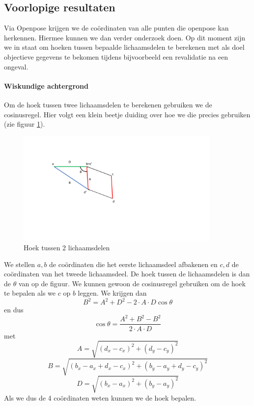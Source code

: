 \documentclass[a4paper,twoside,kulak]{kulakreport}
\begin{document}
\subsection{Voorlopige resultaten}

Via Openpose krijgen we de coördinaten van alle punten die openpose kan herkennen. Hiermee kunnen we dan verder onderzoek doen. Op dit moment zijn we in staat om hoeken tussen bepaalde lichaamsdelen te berekenen met als doel objectieve gegevens te bekomen tijdens bijvoorbeeld een revalidatie na een ongeval.

\paragraph{Wiskundige achtergrond}
Om de hoek tussen twee lichaamsdelen te berekenen gebruiken we de cosinusregel. Hier volgt een klein beetje duiding over hoe we die precies gebruiken (zie figuur \ref{cos}).\\

\begin{figure}[H]
	\begin{center}
		\includegraphics[width=10cm]{cos.pdf}
	\end{center}
	\caption{Hoek tussen 2 lichaamsdelen}
	\label{cos}
\end{figure}

We stellen \(a, b\) de coördinaten die het eerste lichaamsdeel afbakenen en \(c, d\) de coördinaten van het tweede lichaamsdeel. De hoek tussen de lichaamsdelen is dan de \(\theta\) van op de figuur. We kunnen gewoon de cosinusregel gebruiken om de hoek te bepalen als we \(c\) op \(b\) leggen. We krijgen dan
\[B^2 = A^2 + D^2 -2\cdot A\cdot D\cos\theta\]
en dus
\[\cos\theta = \frac{A^2 + B^2 - B^2}{2\cdot A\cdot D}\]
met
\[A = \sqrt{(d_x - c_x)^2 + (d_y - c_y)^2}\]
\[B = \sqrt{(b_x - a_x + d_x - c_x)^2 + (b_y - a_y + d_y - c_y)^2}\]
\[D = \sqrt{(b_x - a_x)^2 + (b_y - a_y)^2}\]
Als we dus de 4 coördinaten weten kunnen we de hoek bepalen.
\end{document}
